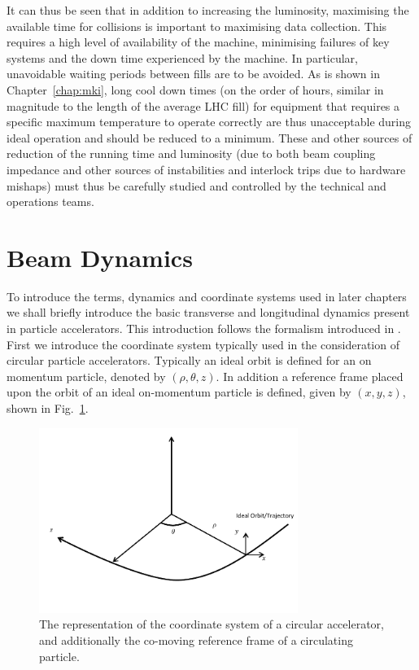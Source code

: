 It can thus be seen that in addition to increasing the luminosity, maximising the available time for collisions is important to maximising data collection. This requires a high level of availability of the machine, minimising failures of key systems and the down time experienced by the machine. In particular, unavoidable waiting periods between fills are to be avoided. As is shown in Chapter~\ref{chap:mki}, long cool down times (on the order of hours, similar in magnitude to the length of the average LHC fill) for equipment that requires a specific maximum temperature to operate correctly are thus unacceptable during ideal operation and should be reduced to a minimum. These and other sources of reduction of the running time and luminosity (due to both beam coupling impedance and other sources of instabilities and interlock trips due to hardware mishaps) must thus be carefully studied and controlled by the technical and operations teams.

\section{Beam Dynamics}
\label{sec:BeamDyn}

To introduce the terms, dynamics and coordinate systems used in later chapters we shall briefly introduce the basic transverse and longitudinal dynamics present in particle accelerators. This introduction follows the formalism introduced in \cite{Holzer:TransDyn}. First we introduce the coordinate system typically used in the consideration of circular particle accelerators. Typically an ideal orbit is defined for an on momentum particle, denoted by $(\rho, \theta, z)$. In addition a reference frame placed upon the orbit of an ideal on-momentum particle is defined, given by $(x, y, z)$, shown in Fig.~\ref{fig:accel-coord-system}. 

\begin{figure}
\begin{center}
\includegraphics[width=0.75\textwidth]{Introduction/figures/coordinate-system.pdf}
\end{center}
\caption{The representation of the coordinate system of a circular accelerator, and additionally the co-moving reference frame of a circulating particle.}
\label{fig:accel-coord-system}
\end{figure}

